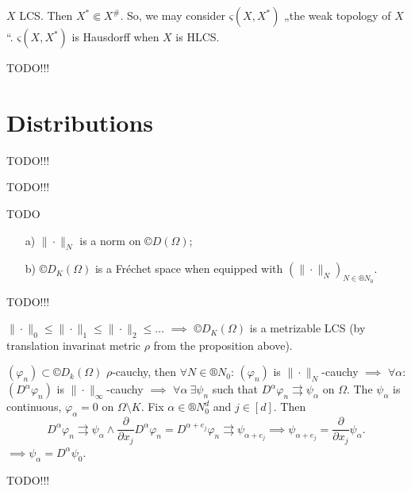\documentclass[12pt]{article}					%
\begin{document}
\begin{priklad}
	$X$ LCS. Then $X^* \Subset X^{\#}$. So, we may consider $ς(X, X^*)$ „the weak topology of $X$“. $ς(X, X^*)$ is Hausdorff when $X$ is HLCS.
\end{priklad}


TODO!!!

\section{Distributions}

TODO!!!


TODO!!!

\begin{lemma}
	TODO

	\begin{itemize}
		\item[a)] $\|·\|_N$ is a norm on $©D(Ω)$;
		\item[b)] $©D_K(Ω)$ is a Fréchet space when equipped with $(\|·\|_N)_{N \in ®N_0}$.
	\end{itemize}

	\begin{dukazin}[a)]
		TODO!!!
	\end{dukazin}

	\begin{dukazin}[b)]
		$\|·\|_0 ≤ \|·\|_1 ≤ \|·\|_2 ≤ … $ $\implies$ $©D_K(Ω)$ is a metrizable LCS (by translation invarinat metric $ρ$ from the proposition above).

		$(φ_n) \subset ©D_k(Ω)$ $ρ$-cauchy, then $\forall N \in ®N_0$: $(φ_n)$ is $\|·\|_N$-cauchy $\implies$ $\forall α$: $(D^α φ_n)$ is $\|·\|_∞$-cauchy $\implies$ $\forall α\ \exists ψ_n$ such that $D^α φ_n \rightrightarrows ψ_α$ on $Ω$. The $ψ_α$ is continuous, $φ_α = 0$ on $Ω \setminus K$. Fix $α \in ®N_0^d$ and $j \in [d]$. Then
		$$ D^α φ_n \rightrightarrows ψ_α \land \frac{\partial}{\partial x_j} D^α φ_n = D^{α+e_j}φ_n \rightrightarrows ψ_{α + e_j} \implies ψ_{α + e_j} = \frac{\partial}{\partial x_j} ψ_α. $$
		$\implies ψ_α = D^α ψ_0$.

		TODO!!!
	\end{dukazin}
\end{lemma}
\end{document}
